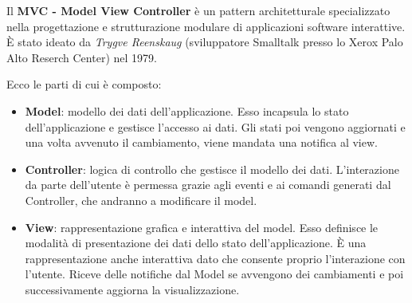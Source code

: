 			Il \textbf{MVC - Model View Controller} \citep{MVC-Slide} è un pattern architetturale specializzato nella progettazione e strutturazione modulare di applicazioni software interattive.
			\`E stato ideato da \textit{Trygve Reenskaug} (sviluppatore Smalltalk presso lo Xerox Palo Alto Reserch Center) nel 1979.
			
			Ecco le parti di cui è composto: 
			\begin{itemize}
				\item \textbf{Model}: modello dei dati dell'applicazione. Esso incapsula lo stato dell'applicazione e gestisce l'accesso ai dati. Gli stati poi vengono aggiornati e una volta avvenuto il cambiamento, viene mandata una notifica al view.

				\item \textbf{Controller}: logica di controllo che gestisce il modello dei dati. L'interazione da parte dell'utente è permessa grazie agli eventi e ai comandi generati dal Controller, che andranno a modificare il model.
			
				\item \textbf{View}: rappresentazione grafica e interattiva del model. Esso definisce le modalità di presentazione dei dati dello stato dell'applicazione. \`E una rappresentazione anche interattiva dato che consente proprio l'interazione con l'utente. 
				Riceve delle notifiche dal Model se avvengono dei cambiamenti e poi successivamente aggiorna la visualizzazione. 
			\end{itemize}
			
			\begin{center}
				\label{img:MVCClass}
			\end{center}
			
